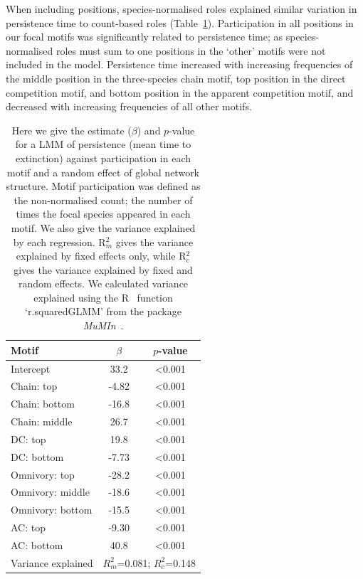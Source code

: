 \documentclass[12pt]{article}
\begin{document}
\begin{spacing}{2.0}
        
        When including positions, species-normalised roles explained similar variation in persistence time to count-based roles (Table~\ref{tab:freq_positions}).
        Participation in all positions in our focal motifs was significantly related to persistence time; as species-normalised roles must sum to one positions in the `other' motifs were not included in the model.
        Persistence time increased with increasing frequencies of the middle position in the three-species chain motif, top position in the direct competition motif, and bottom position in the apparent competition motif, and decreased with increasing frequencies of all other motifs.
        

		\begin{table}[hb!]
    		\caption{Here we give the estimate ($\beta$) and $p$-value for a LMM of persistence (mean time to extinction) against participation in each motif and a random effect of global network structure. Motif participation was defined as the non-normalised count; the number of times the focal species appeared in each motif. We also give the variance explained by each regression. R$^{2}_{m}$ gives the variance explained by fixed effects only, while R$^{2}_{c}$ gives the variance explained by fixed and random effects. We calculated variance explained using the R~\citep{R} function `r.squaredGLMM' from the package \emph{MuMIn}~\citep{MuMIn}.}
    		\label{tab:freq_positions}
    		\begin{tabular}{l | c c}
    		Motif & $\beta$ & $p$-value \\  
    		\hline
            Intercept	&	33.2	&	\textless0.001	\\
            Chain: top	&	-4.82	&	\textless0.001	\\
            Chain: bottom	&	-16.8	&	\textless0.001	\\
            Chain: middle	&	26.7	&	\textless0.001	\\
            DC: top	&	19.8	&	\textless0.001	\\
            DC: bottom	&	-7.73	&	\textless0.001	\\
            Omnivory: top	&	-28.2	&	\textless0.001	\\
            Omnivory: middle	&	-18.6	&	\textless0.001	\\
            Omnivory: bottom	&	-15.5	&	\textless0.001	\\
            AC: top	&	-9.30	&	\textless0.001	\\
            AC: bottom	&	40.8	&	\textless0.001	\\
            \hline
    		Variance explained & \multicolumn{2}{c}{$R^{2}_m$=0.081; $R^2_c$=0.148} \\
    		\hline
    		\end{tabular}
    		\end{table}


\end{spacing}
\end{document}
